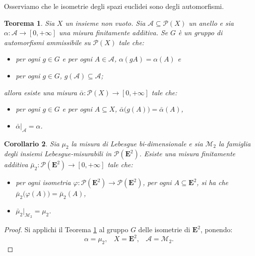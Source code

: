 \documentclass[a4paper,oneside,11pt]{book}
\theoremstyle{definition} \newtheorem{Def}{Definizione}
\theoremstyle{plain} \newtheorem{teo}{Teorema}
\theoremstyle{plain} \newtheorem{cor}[teo]{Corollario}
\theoremstyle{definition} \newtheorem{lem}[teo]{Lemma}
\theoremstyle{plain} \newtheorem{pro}[teo]{Proposizione}
\begin{document}
	Osserviamo che le isometrie degli spazi euclidei sono degli automorfismi.
	
	\begin{teo}\label{cap2teo1}
		Sia $X$ un insieme non vuoto. Sia $\mathcal{A} \subseteq \mathcal{P}(X)$ un anello e sia $\alpha: \mathcal{A} \to [0, +\infty]$ una misura finitamente additiva. Se $G$ è un gruppo di automorfismi ammissibile su $\mathcal{P}(X)$ tale che:
		\begin{itemize}
			\item per ogni $g \in G$ e per ogni $A \in \mathcal{A}$, $\alpha(gA) = \alpha(A)$ e
			\item per ogni $g \in G$, $g(\mathcal{A}) \subseteq \mathcal{A}$;
		\end{itemize}
		allora esiste una misura $\bar{\alpha}: \mathcal{P}(X) \to [0, +\infty]$ tale che:
		\begin{itemize}
			\item per ogni $g \in G$ e per ogni $A \subseteq X$, $\bar{\alpha}\big(g(A)\big) = \bar{\alpha}(A)$,
			\item $\bar{\alpha}\big|_{\mathcal{A}} = \alpha$.
		\end{itemize}
	\end{teo}
	
	\begin{cor}\label{cap2cor1}
		Sia $\mu_2$ la misura di Lebesgue bi-dimensionale e sia $\mathcal{M}_2$ la famiglia degli insiemi Lebesgue-misurabili in $\mathcal{P}(\mathbf{E}^2)$. Esiste una misura finitamente additiva $\bar{\mu}_2: \mathcal{P}(\mathbf{E}^2) \to [0, +\infty]$ tale che:
		\begin{itemize}
			\item per ogni isometria $\varphi: \mathcal{P}(\mathbf{E}^2) \to \mathcal{P}(\mathbf{E}^2)$, per ogni $A \subseteq \mathbf{E}^2$, si ha che $\bar{\mu}_2 \big(\varphi(A)\big) = \bar{\mu}_2(A)$,
			\item $\bar{\mu}_2\big|_{\mathcal{M}_2} = \mu_2$.
		\end{itemize}
	\end{cor}
	
	\begin{proof}
		Si applichi il Teorema \ref{cap2teo1} al gruppo $G$ delle isometrie di $\mathbf{E}^2$, ponendo:
		\begin{equation*}
			\alpha = \mu_2 \text{,} \quad X = \mathbf{E}^2 \text{,} \quad \mathcal{A} = \mathcal{M}_2 \text{.}
		\end{equation*}
	\end{proof}
	
\end{document}
